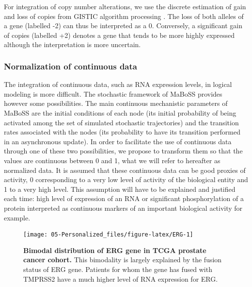 \documentclass[a4paper,12pt,twoside,onecolumn,openright,final,oldfontcommands]{memoir}
\begin{document}
For integration of copy number alterations, we use the discrete
estimation of gain and loss of copies from GISTIC algorithm processing
\citep{mermel2011gistic}. The loss of both alleles of a gene (labelled
-2) can thus be interpreted as a 0. Conversely, a significant gain of
copies (labelled +2) denotes a gene that tends to be more highly
expressed although the interpretation is more uncertain.

\subsubsection{Normalization of continuous
data}\label{normalization-of-continuous-data}

The integration of continuous data, such as RNA expression levels, in
logical modeling is more difficult. The stochastic framework of MaBoSS
provides however some possibilities. The main continuous mechanistic
parameters of MaBoSS are the initial conditions of each node (its
initial probability of being activated among the set of simulated
stochastic trajectories) and the transition rates associated with the
nodes (its probability to have its transition performed in an
asynchronous update). In order to facilitate the use of continuous data
through one of these two possibilities, we propose to transform them so
that the values are continuous between 0 and 1, what we will refer to
hereafter as normalized data. It is assumed that these continuous data
can be good proxies of activity, 0 corresponding to a very low level of
activity of the biological entity and 1 to a very high level. This
assumption will have to be explained and justified each time: high level
of expression of an RNA or significant phosphorylation of a protein
interpreted as continuous markers of an important biological activity
for example.

\begin{figure}

{\centering \texttt{[image: 05-Personalized\_files/figure-latex/ERG-1]} 

}

\caption[Bimodal distribution of ERG gene in TCGA prostate cancer cohort]{\textbf{Bimodal distribution of ERG gene in TCGA
prostate cancer cohort.} This bimodality is largely explained by the
fusion status of ERG gene. Patients for whom the gene has fused with
TMPRSS2 have a much higher level of RNA expression for ERG.}\label{fig:ERG}
\end{figure}
\end{document}
